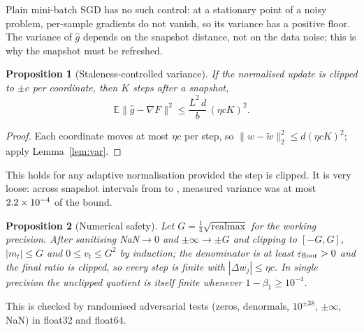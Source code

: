 \documentclass[11pt]{article}
\newtheorem{proposition}{Proposition}
\theoremstyle{remark}
\newcommand{\E}{\mathbb{E}}
\newcommand{\norm}[1]{\lVert #1\rVert}
\newcommand{\ghat}{\hat g}
\begin{document}
Plain mini-batch SGD has no such control: at a stationary point of a noisy problem, per-sample gradients do not vanish, so its variance has a positive floor. The variance of $\ghat$ depends on the snapshot distance, not on the data noise; this is why the snapshot must be refreshed.

\setcounter{proposition}{2}%
\begin{proposition}[Staleness-controlled variance]\label{prop:stale}
If the normalised update is clipped to $\pm c$ per coordinate, then $K$ steps after a snapshot,
\[
\E\norm{\ghat-\nabla F}^2\le\frac{\bar L^2\,d}{b}\,(\eta c K)^2 .
\]
\end{proposition}
\begin{proof}
Each coordinate moves at most $\eta c$ per step, so $\norm{w-\tilde w}_2^2\le d(\eta cK)^2$; apply Lemma~\ref{lem:var}.
\end{proof}
This holds for any adaptive normalisation provided the step is clipped. It is very loose: across snapshot intervals from \ExpNineKmin{} to \ExpNineKmax{}, measured variance was at most $2.2\times 10^{-4}$ of the bound.

\begin{proposition}[Numerical safety]\label{prop:safe}
Let $G=\tfrac14\sqrt{\text{realmax}}$ for the working precision. After sanitising NaN$\to0$ and $\pm\infty\to\pm G$ and clipping to $[-G,G]$, $|m_t|\le G$ and $0\le v_t\le G^2$ by induction; the denominator is at least $\varepsilon_{\rm floor}>0$ and the final ratio is clipped, so every step is finite with $|\Delta w_j|\le\eta c$. In single precision the unclipped quotient is itself finite whenever $1-\beta_1\ge10^{-4}$.
\end{proposition}
This is checked by randomised adversarial tests (zeros, denormals, $10^{\pm38}$, $\pm\infty$, NaN) in float32 and float64.
\end{document}
